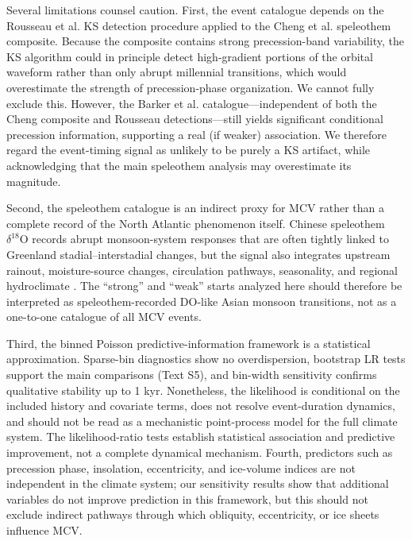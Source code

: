 \documentclass[11pt]{article}
\begin{document}
Several limitations counsel caution. First, the event catalogue depends on the Rousseau et al. KS detection procedure applied to the Cheng et al. speleothem composite. Because the composite contains strong precession-band variability, the KS algorithm could in principle detect high-gradient portions of the orbital waveform rather than only abrupt millennial transitions, which would overestimate the strength of precession-phase organization. We cannot fully exclude this. However, the Barker et al. catalogue---independent of both the Cheng composite and Rousseau detections---still yields significant conditional precession information, supporting a real (if weaker) association. We therefore regard the event-timing signal as unlikely to be purely a KS artifact, while acknowledging that the main speleothem analysis may overestimate its magnitude.

Second, the speleothem catalogue is an indirect proxy for MCV rather than a complete record of the North Atlantic phenomenon itself. Chinese speleothem \(\delta^{18}\mathrm{O}\) records abrupt monsoon-system responses that are often tightly linked to Greenland stadial--interstadial changes, but the signal also integrates upstream rainout, moisture-source changes, circulation pathways, seasonality, and regional hydroclimate \citep{liu2014chinese,cheng2021orbital,zheng2022decoupled}. The ``strong'' and ``weak'' starts analyzed here should therefore be interpreted as speleothem-recorded DO-like Asian monsoon transitions, not as a one-to-one catalogue of all MCV events.

Third, the binned Poisson predictive-information framework is a statistical approximation. Sparse-bin diagnostics show no overdispersion, bootstrap LR tests support the main comparisons (Text S5), and bin-width sensitivity confirms qualitative stability up to 1 kyr. Nonetheless, the likelihood is conditional on the included history and covariate terms, does not resolve event-duration dynamics, and should not be read as a mechanistic point-process model for the full climate system. The likelihood-ratio tests establish statistical association and predictive improvement, not a complete dynamical mechanism. Fourth, predictors such as precession phase, insolation, eccentricity, and ice-volume indices are not independent in the climate system; our sensitivity results show that additional variables do not improve prediction in this framework, but this should not exclude indirect pathways through which obliquity, eccentricity, or ice sheets influence MCV.
\end{document}
